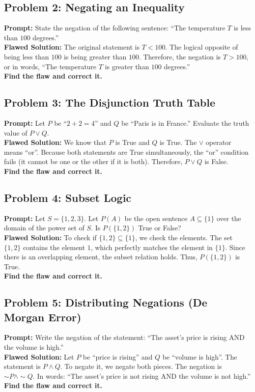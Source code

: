 \documentclass[11pt]{article}
\begin{document}
\subsection{Problem 2: Negating an Inequality}
\textbf{Prompt:} State the negation of the following sentence: ``The temperature $T$ is less than $100$ degrees.'' \\
\textbf{Flawed Solution:} The original statement is $T < 100$. The logical opposite of being less than $100$ is being greater than $100$. Therefore, the negation is $T > 100$, or in words, ``The temperature $T$ is greater than $100$ degrees.'' \\
\textbf{Find the flaw and correct it.}

\subsection{Problem 3: The Disjunction Truth Table}
\textbf{Prompt:} Let $P$ be ``$2+2=4$'' and $Q$ be ``Paris is in France.'' Evaluate the truth value of $P \lor Q$. \\
\textbf{Flawed Solution:} We know that $P$ is True and $Q$ is True. The $\lor$ operator means ``or''. Because both statements are True simultaneously, the ``or'' condition fails (it cannot be one or the other if it is both). Therefore, $P \lor Q$ is False. \\
\textbf{Find the flaw and correct it.}

\subsection{Problem 4: Subset Logic}
\textbf{Prompt:} Let $S = \{1, 2, 3\}$. Let $P(A)$ be the open sentence $A \subseteq \{1\}$ over the domain of the power set of $S$. Is $P(\{1, 2\})$ True or False? \\
\textbf{Flawed Solution:} To check if $\{1, 2\} \subseteq \{1\}$, we check the elements. The set $\{1, 2\}$ contains the element $1$, which perfectly matches the element in $\{1\}$. Since there is an overlapping element, the subset relation holds. Thus, $P(\{1, 2\})$ is True. \\
\textbf{Find the flaw and correct it.}

\subsection{Problem 5: Distributing Negations (De Morgan Error)}
\textbf{Prompt:} Write the negation of the statement: ``The asset's price is rising AND the volume is high.'' \\
\textbf{Flawed Solution:} Let $P$ be ``price is rising'' and $Q$ be ``volume is high''. The statement is $P \land Q$. To negate it, we negate both pieces. The negation is $\sim P \land \sim Q$. In words: ``The asset's price is not rising AND the volume is not high.'' \\
\textbf{Find the flaw and correct it.}
\end{document}
